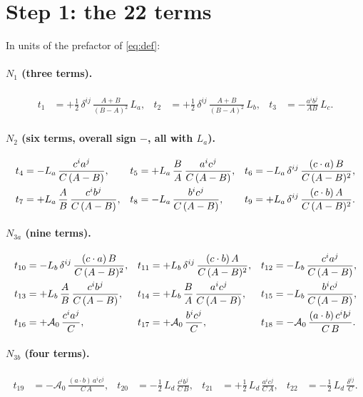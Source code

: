 \documentclass[10pt]{article}
\numberwithin{equation}{section}
\begin{document}
\section{Step 1: the 22 terms}

In units of the prefactor of \eqref{eq:def}:

\paragraph{$N_{1}$ (three terms).}
\begin{align}
t_{1}&=+\frac12\,\delta^{ij}\,\frac{A+B}{(B-A)^{2}}\,L_{a}, &
t_{2}&=+\frac12\,\delta^{ij}\,\frac{A+B}{(B-A)^{2}}\,L_{b}, &
t_{3}&=-\frac{a^{i}b^{j}}{AB}\,L_{c}.
\end{align}

\paragraph{$N_{2}$ (six terms, overall sign $-$, all with $L_{a}$).}
\begin{align}
t_{4}&=-L_{a}\,\frac{c^{i}a^{j}}{C\,(A-B)}, &
t_{5}&=+L_{a}\,\frac{B}{A}\,\frac{a^{i}c^{j}}{C\,(A-B)}, &
t_{6}&=-L_{a}\,\delta^{ij}\,\frac{(c\cdot a)\,B}{C\,(A-B)^{2}},\notag\\
t_{7}&=+L_{a}\,\frac{A}{B}\,\frac{c^{i}b^{j}}{C\,(A-B)}, &
t_{8}&=-L_{a}\,\frac{b^{i}c^{j}}{C\,(A-B)}, &
t_{9}&=+L_{a}\,\delta^{ij}\,\frac{(c\cdot b)\,A}{C\,(A-B)^{2}}.
\end{align}

\paragraph{$N_{3a}$ (nine terms).}
\begin{align}
t_{10}&=-L_{b}\,\delta^{ij}\,\frac{(c\cdot a)\,B}{C\,(A-B)^{2}}, &
t_{11}&=+L_{b}\,\delta^{ij}\,\frac{(c\cdot b)\,A}{C\,(A-B)^{2}}, &
t_{12}&=-L_{b}\,\frac{c^{i}a^{j}}{C\,(A-B)},\notag\\
t_{13}&=+L_{b}\,\frac{A}{B}\,\frac{c^{i}b^{j}}{C\,(A-B)}, &
t_{14}&=+L_{b}\,\frac{B}{A}\,\frac{a^{i}c^{j}}{C\,(A-B)}, &
t_{15}&=-L_{b}\,\frac{b^{i}c^{j}}{C\,(A-B)},\notag\\
t_{16}&=+\mathcal{A}_{0}\,\frac{c^{i}a^{j}}{C}, &
t_{17}&=+\mathcal{A}_{0}\,\frac{b^{i}c^{j}}{C}, &
t_{18}&=-\mathcal{A}_{0}\,\frac{(a\cdot b)\,c^{i}b^{j}}{C\,B}.
\end{align}

\paragraph{$N_{3b}$ (four terms).}
\begin{align}
t_{19}&=-\mathcal{A}_{0}\,\frac{(a\cdot b)\,a^{i}c^{j}}{C\,A}, &
t_{20}&=-\frac12\,L_{d}\,\frac{c^{i}b^{j}}{C\,B}, &
t_{21}&=+\frac12\,L_{d}\,\frac{a^{i}c^{j}}{C\,A}, &
t_{22}&=-\frac12\,L_{d}\,\frac{\delta^{ij}}{C}.
\end{align}
\end{document}
